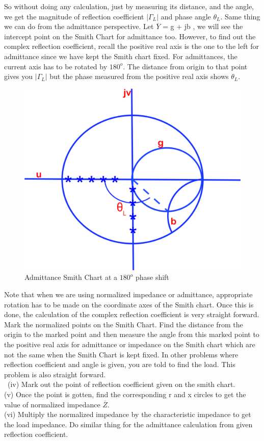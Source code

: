 So without doing any calculation, just by measuring its distance, and the angle, we get the magnitude of reflection coefficient   $|\Gamma_L|$
and phase angle $\theta_L$. Same thing we can do from the admittance perspective. Let $\overline{Y}$ = g + jb , we will see the intercept point on the Smith Chart for admittance too. However, to find out the complex reflection coefficient, recall the positive real axis is the one to the left for admittance since we have kept the Smith chart fixed. For admittances, the current axis has to be rotated by $180^o$. The distance from origin to that point gives you  $|\Gamma_L|$ but the phase measured from the  positive real axis shows $\theta_L$. 
\begin{figure}[h]
\centering
\includegraphics[width=0.6\linewidth]{./graphics/KJHGFDS}
\caption{Admittance Smith Chart at a $180^o$ phase shift}
\label{fig:kjhgfds}
\end{figure}

Note that when we are using normalized impedance or admittance, appropriate rotation has to be made on the coordinate axes of the Smith chart. Once this is done, the calculation of the complex reflection coefficient is very straight forward. Mark the normalized points on the Smith Chart. Find the distance from the origin to the marked point and then measure the angle from this marked point to the positive real axis for admittance or impedance on the  Smith chart which are not the same when the Smith Chart is kept fixed. In other problems where reflection coefficient and angle is given, you are told to find the load. This problem is also straight forward.\\\
(iv) Mark out the point of  reflection coefficient given on the smith chart.\\
(v) Once the point is gotten, find the corresponding r and x circles to get the value of normalized impedance $\overline{Z}$.\\
(vi) Multiply the normalized impedance by the characteristic impedance to get the load impedance. Do similar thing for the admittance calculation from given reflection coefficient.\\


